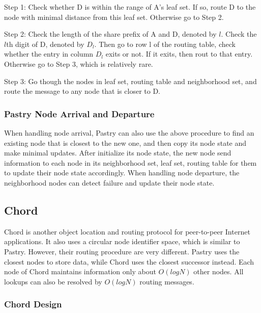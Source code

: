 \documentclass[11pt,a4paper]{article}
\begin{document}
    Step 1: Check whether D is within the range of A’s leaf set. If so, route D to the node with minimal distance from this leaf set. Otherwise go to Step 2.
    
    Step 2: Check the length of the share prefix of A and D, denoted by \(l\). Check the \(l\)th digit of D, denoted by \(D_l\). Then go to row l of the routing table, check whether the entry in column \(D_l\) exits or not. If it exits, then rout to that entry. Otherwise go to Step 3, which is relatively rare.
    
    Step 3: Go though the nodes in leaf set, routing table and neighborhood set, and route the message to any node that is closer to D.
    
    \subsubsection{Pastry Node Arrival and Departure}
    When handling node arrival, Pastry can also use the above procedure to find an existing node that is closest to the new one, and then copy its node state and make minimal updates. After initialize its node state, the new node send information to each node in its neighborhood set, leaf set, routing table for them to update their node state accordingly. When handling node departure, the neighborhood nodes can detect failure and update their node state.
    
    \subsection{Chord} \label{chord}
    Chord \cite{ChordStoica} is another object location and routing protocol for peer-to-peer Internet applications. It also uses a circular node identifier space, which is similar to Pastry. However, their routing procedure are very different. Pastry uses the closest nodes to store data, while Chord uses the closest successor instead. Each node of Chord maintains information only about \( O(log N) \) other nodes. All lookups can also be resolved by \( O(log N) \) routing messages.
    
    \subsubsection{Chord Design}
    
\end{document}
